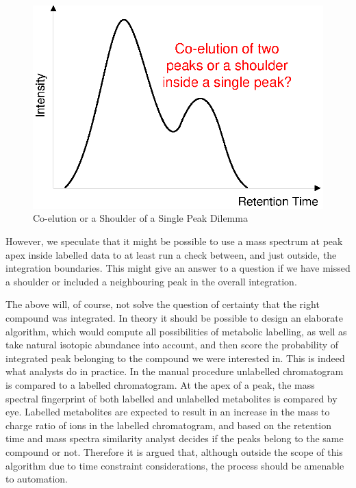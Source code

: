 \begin{figure}
  \begin{center}
    \includegraphics[scale=1]{graphics/chapter08/90.eps}
  \end{center}
  \caption{Co-elution or a Shoulder of a Single Peak Dilemma}
  \label{fig:90}
\end{figure}

However, we speculate that it might be possible to use a mass spectrum at peak 
apex inside labelled data to at least run a check between, and just outside, 
the integration boundaries. This might give an answer to a question if we have 
missed a shoulder or included a neighbouring peak in the overall integration. 

The above will, of course, not solve the question of certainty that the right 
compound was integrated. In theory it should be possible to design an elaborate 
algorithm, which would compute all possibilities of metabolic labelling, as 
well as take natural isotopic abundance into account, and then score the 
probability of integrated peak belonging to the compound we were interested in. 
This is indeed what analysts do in practice. In the manual procedure unlabelled 
chromatogram is compared to a labelled chromatogram. At the apex of a peak, the 
mass spectral fingerprint of both labelled and unlabelled metabolites is 
compared by eye. Labelled metabolites are expected to result in an increase in 
the mass to charge ratio of ions in the labelled chromatogram, and based on the 
retention time and mass spectra similarity analyst decides if the peaks belong 
to the same compound or not. Therefore it is argued that, although outside the 
scope of this algorithm due to time constraint considerations, the process 
should be amenable to automation. 

